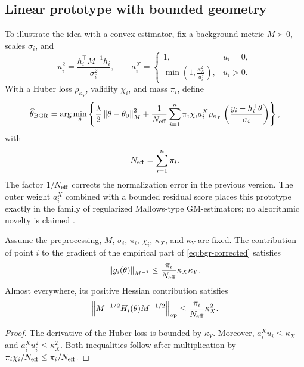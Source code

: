 \subsection{Linear prototype with bounded geometry}
To illustrate the idea with a convex estimator, fix a background metric $M\succ0$, scales $\sigma_i$, and
\[
u_i^2=\frac{h_i^\top M^{-1}h_i}{\sigma_i^2},
\qquad
a_i^X=
\begin{cases}
1,&u_i=0,\\[1mm]
\displaystyle\min\left(1,\frac{\kappa_X^2}{u_i^2}\right),&u_i>0.
\end{cases}
\]
With a Huber loss $\rho_{\kappa_Y}$, validity $\chi_i$, and mass $\pi_i$, define
\begin{equation}
\widehat\theta_{\rm BGR}
=
\arg\min_\theta
\left\{
\frac\lambda2\left\lVert \theta-\theta_0\right\rVert_M^2
+
\frac{1}{N_{\rm eff}}
\sum_{i=1}^n
\pi_i\chi_i a_i^X
\rho_{\kappa_Y}\left(\frac{y_i-h_i^\top\theta}{\sigma_i}\right)
\right\},
\label{eq:bgr-corrected}
\end{equation}
with
\begin{equation}
N_{\rm eff}=\sum_{i=1}^n\pi_i.
\label{eq:effective-mass}
\end{equation}
The factor $1/N_{\rm eff}$ corrects the normalization error in the previous version. The outer weight $a_i^X$ combined with a bounded residual score places this prototype exactly in the family of regularized Mallows-type GM-estimators; no algorithmic novelty is claimed \citep{huber1964,mallows1975,krasker1982,richardson1997}.

\begin{proposition}
Assume the preprocessing, $M$, $\sigma_i$, $\pi_i$, $\chi_i$, $\kappa_X$, and $\kappa_Y$ are fixed. The contribution of point $i$ to the gradient of the empirical part of \eqref{eq:bgr-corrected} satisfies
\begin{equation}
\left\lVert g_i(\theta)\right\rVert_{M^{-1}}
\leq
\frac{\pi_i}{N_{\rm eff}}\kappa_X\kappa_Y.
\label{eq:gradient-bound}
\end{equation}
Almost everywhere, its positive Hessian contribution satisfies
\begin{equation}
\left\lVert M^{-1/2}H_i(\theta)M^{-1/2}\right\rVert_{\rm op}
\leq
\frac{\pi_i}{N_{\rm eff}}\kappa_X^2.
\label{eq:hessian-bound}
\end{equation}
\end{proposition}

\begin{proof}
The derivative of the Huber loss is bounded by $\kappa_Y$. Moreover, $a_i^Xu_i\leq\kappa_X$ and $a_i^Xu_i^2\leq\kappa_X^2$. Both inequalities follow after multiplication by $\pi_i\chi_i/N_{\rm eff}\leq\pi_i/N_{\rm eff}$.
\end{proof}

